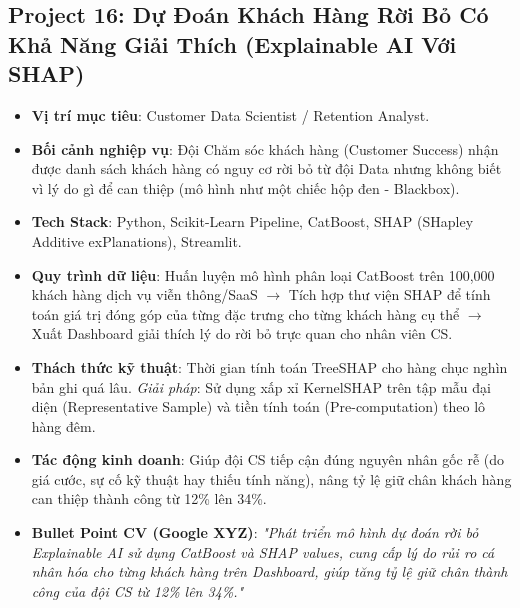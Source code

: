 \subsection{Project 16: Dự Đoán Khách Hàng Rời Bỏ Có Khả Năng Giải Thích (Explainable AI Với SHAP)}
\begin{itemize}
    \item \textbf{Vị trí mục tiêu}: Customer Data Scientist / Retention Analyst.
    \item \textbf{Bối cảnh nghiệp vụ}: Đội Chăm sóc khách hàng (Customer Success) nhận được danh sách khách hàng có nguy cơ rời bỏ từ đội Data nhưng không biết vì lý do gì để can thiệp (mô hình như một chiếc hộp đen - Blackbox).
    \item \textbf{Tech Stack}: Python, Scikit-Learn Pipeline, CatBoost, SHAP (SHapley Additive exPlanations), Streamlit.
    \item \textbf{Quy trình dữ liệu}: Huấn luyện mô hình phân loại CatBoost trên 100,000 khách hàng dịch vụ viễn thông/SaaS $\rightarrow$ Tích hợp thư viện SHAP để tính toán giá trị đóng góp của từng đặc trưng cho từng khách hàng cụ thể $\rightarrow$ Xuất Dashboard giải thích lý do rời bỏ trực quan cho nhân viên CS.
    \item \textbf{Thách thức kỹ thuật}: Thời gian tính toán TreeSHAP cho hàng chục nghìn bản ghi quá lâu. \textit{Giải pháp}: Sử dụng xấp xỉ KernelSHAP trên tập mẫu đại diện (Representative Sample) và tiền tính toán (Pre-computation) theo lô hàng đêm.
    \item \textbf{Tác động kinh doanh}: Giúp đội CS tiếp cận đúng nguyên nhân gốc rễ (do giá cước, sự cố kỹ thuật hay thiếu tính năng), nâng tỷ lệ giữ chân khách hàng can thiệp thành công từ 12\% lên 34\%.
    \item \textbf{Bullet Point CV (Google XYZ)}: \textit{"Phát triển mô hình dự đoán rời bỏ Explainable AI sử dụng CatBoost và SHAP values, cung cấp lý do rủi ro cá nhân hóa cho từng khách hàng trên Dashboard, giúp tăng tỷ lệ giữ chân thành công của đội CS từ 12\% lên 34\%."}
\end{itemize}

